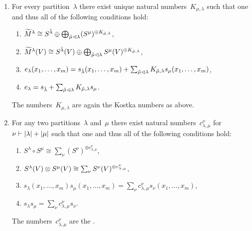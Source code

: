 \documentclass[a4paper,10pt]{scrartcl}
\begin{document}
\begin{example}
\begin{enumerate}
    \item
      For every partition~$\lambda$ there exist unique natural numbers~$K_{\mu, \lambda}$ such that one and thus all of the following conditions hold:
      \begin{enumerate}
        \item
          $\widetilde{M}^\lambda \cong S^{\tilde{\lambda}} \oplus \bigoplus_{\tilde{\mu} \vartriangleleft \lambda} (S^\mu)^{\oplus K_{\tilde{\mu}, \lambda}}$,
        \item
          $\widetilde{M}^\lambda(V) \cong S^{\tilde{\lambda}}(V) \oplus \bigoplus_{\tilde{\mu} \vartriangleleft \lambda} S^\mu(V)^{\oplus K_{\tilde{\mu}, \lambda}}$,
        \item
          $e_\lambda(x_1, \dotsc, x_m) = s_{\tilde{\lambda}}(x_1, \dotsc, x_m) + \sum_{\tilde{\mu} \vartriangleleft \lambda} K_{\tilde{\mu}, \lambda} s_\mu(x_1, \dotsc, x_m)$,
        \item
          $e_\lambda = s_{\tilde{\lambda}} + \sum_{\tilde{\mu} \vartriangleleft \lambda} K_{\tilde{\mu}, \lambda} s_\mu$.
      \end{enumerate}
      The numbers~$K_{\mu, \lambda}$ are again the Kostka numbers as above.
    \item
      For any two partitions~$\lambda$ and~$\mu$ there exist natural numbers~$c^{\nu}_{\lambda, \mu}$ for~$\nu \vdash \lvert\lambda\rvert + \lvert\mu\rvert$ such that one and thus all of the following conditions hold:
      \begin{enumerate}
        \item
          $S^\lambda \circ S^\mu \cong \sum_\nu (S^\nu)^{\oplus c_{\lambda, \mu}^{\nu}}$,
        \item
          $S^\lambda(V) \otimes S^\mu(V) \cong \sum_\nu S^\nu(V)^{\oplus c_{\lambda, \mu}^{\nu}}$,
        \item
          $s_\lambda(x_1, \dotsc, x_m) s_\mu(x_1, \dotsc, x_m) = \sum_{\nu} c_{\lambda, \mu}^\nu s_\nu(x_1, \dotsc, x_m)$,
        \item
          $s_\lambda s_\mu = \sum_{\nu} c_{\lambda, \mu}^{\nu} s_\nu$.
      \end{enumerate}
      The numbers~$c_{\lambda, \mu}^{\nu}$ are the .
  \end{enumerate}
\end{example}
\end{document}
